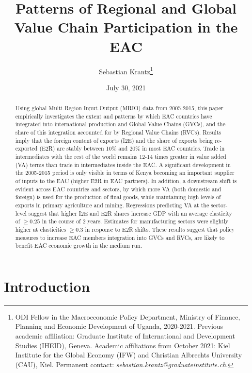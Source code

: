 \documentclass[a4paper]{article}
\date{July 30, 2021}
\title{\textbf{Patterns of Regional and Global Value Chain Participation in the EAC}}
\author{Sebastian Krantz\footnote{ODI Fellow in the Macroeconomic Policy Department, Ministry of Finance, Planning and Economic Development of Uganda, 2020-2021. Previous academic affiliation: Graduate Institute of International and Development Studies (IHEID), Geneva. Academic affiliations from October 2021: Kiel Institute for the Global Economy (IFW) and Christian Albrechts University (CAU), Kiel. Permanent contact: \emph{sebastian.krantz@graduateinstitute.ch}.}}
\begin{document}
\maketitle

\begin{abstract}
Using global Multi-Region Input-Output (MRIO) data from 2005-2015, this paper empirically investigates the extent and patterns by which EAC countries have integrated into international production and Global Value Chains (GVCs), and the share of this integration accounted for by Regional Value Chains (RVCs). Results imply that the foreign content of exports (I2E) and the share of exports being re-exported (E2R) are stably between 10\% and 20\% in most EAC countries. Trade in intermediates with the rest of the world remains 12-14 times greater in value added (VA) terms than trade in intermediates inside the EAC. A significant development in the 2005-2015 period is only visible in %
terms of Kenya becoming an important supplier of inputs to the EAC (higher E2R in EAC partners). In addition, a downstream shift is evident across EAC countries and sectors, by which more VA (both domestic and foreign) is used for the production of final goods, while maintaining high levels of exports in primary agriculture and mining. Regressions predicting VA at the sector-level suggest that higher I2E and E2R shares increase GDP with an average elasticity of $\geq 0.25$ in the course of 2 years. Estimates for manufacturing sectors were slightly higher at elasticities $\geq 0.3$ in response to E2R shifts. These results suggest that policy measures to increase EAC members integration into GVCs and RVCs, %
are likely to benefit EAC economic growth in the medium run.  
\end{abstract}

\vspace{4.8cm}



\newpage

\section{Introduction}
\end{document}
